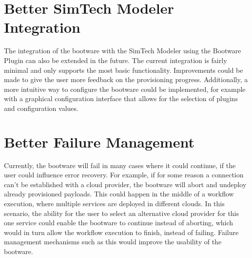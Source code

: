 \section{Better SimTech Modeler Integration}

The integration of the bootware with the SimTech Modeler using the Bootware Plugin can also be extended in the future.
The current integration is fairly minimal and only supports the most basic functionality.
Improvements could be made to give the user more feedback on the provisioning progress.
Additionally, a more intuitive way to configure the bootware could be implemented, for example with a graphical configuration interface that allows for the selection of plugins and configuration values.

\section{Better Failure Management}

Currently, the bootware will fail in many cases where it could continue, if the user could influence error recovery.
For example, if for some reason a connection can't be established with a cloud provider, the bootware will abort and undeploy already provisioned payloads.
This could happen in the middle of a workflow execution, where multiple services are deployed in different clouds.
In this scenario, the ability for the user to select an alternative cloud provider for this one service could enable the bootware to continue instead of aborting, which would in turn allow the workflow execution to finish, instead of failing.
Failure management mechanisms such as this would improve the usability of the bootware.
